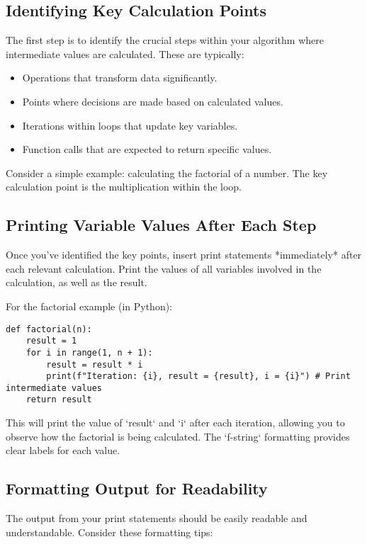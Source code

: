 \documentclass{article}
\begin{document}
{{{\subsection*{Identifying Key Calculation Points}

The first step is to identify the crucial steps within your algorithm where intermediate values are calculated. These are typically:

\begin{itemize}
    \item Operations that transform data significantly.
    \item Points where decisions are made based on calculated values.
    \item Iterations within loops that update key variables.
    \item Function calls that are expected to return specific values.
\end{itemize}

Consider a simple example: calculating the factorial of a number. The key calculation point is the multiplication within the loop.

\subsection*{Printing Variable Values After Each Step}

Once you've identified the key points, insert print statements *immediately* after each relevant calculation. Print the values of all variables involved in the calculation, as well as the result.

For the factorial example (in Python):

\begin{verbatim}
def factorial(n):
    result = 1
    for i in range(1, n + 1):
        result = result * i
        print(f"Iteration: {i}, result = {result}, i = {i}") # Print intermediate values
    return result
\end{verbatim}

This will print the value of `result` and `i` after each iteration, allowing you to observe how the factorial is being calculated. The `f-string` formatting provides clear labels for each value.

\subsection*{Formatting Output for Readability}

The output from your print statements should be easily readable and understandable. Consider these formatting tips:

}}}
\end{document}

